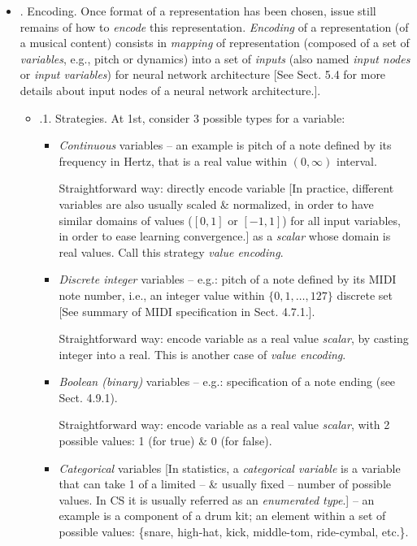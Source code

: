 \documentclass{article}
\begin{document}
\begin{itemize}
\begin{itemize}
\begin{itemize}
		\end{itemize}
		\item {. Encoding.} Once format of a representation has been chosen, issue still remains of how to {\it encode} this representation. {\it Encoding} of a representation (of a musical content) consists in {\it mapping} of representation (composed of a set of {\it variables}, e.g., pitch or dynamics) into a set of {\it inputs} (also named {\it input nodes} or {\it input variables}) for neural network architecture [See Sect. 5.4 for more details about input nodes of a neural network architecture.].
		\begin{itemize}
			\item {.1. Strategies.} At 1st, consider 3 possible types for a variable:
			\begin{itemize}
				\item {\it Continuous} variables -- an example is pitch of a note defined by its frequency in Hertz, that is a real value within $(0,\infty)$ interval.
				
				Straightforward way: directly encode variable [In practice, different variables are also usually scaled \& normalized, in order to have similar domains of values ($[0,1]$ or $[-1,1]$) for all input variables, in order to ease learning convergence.] as a {\it scalar} whose domain is real values. Call this strategy {\it value encoding}.
				\item {\it Discrete integer} variables -- e.g.: pitch of a note defined by its MIDI note number, i.e., an integer value within $\{0,1,\ldots,127\}$ discrete set [See summary of MIDI specification in Sect. 4.7.1.].
				
				Straightforward way: encode variable as a real value {\it scalar}, by casting integer into a real. This is another case of {\it value encoding}.
				\item {\it Boolean (binary)} variables -- e.g.: specification of a note ending (see Sect. 4.9.1).
				
				Straightforward way: encode variable as a real value {\it scalar}, with 2 possible values: 1 (for true) \& 0 (for false).
				\item {\it Categorical} variables [In statistics, a {\it categorical variable} is a variable that can take 1 of a limited -- \& usually fixed -- number of possible values. In CS it is usually referred as an {\it enumerated type}.] -- an example is a component of a drum kit; an element within a set of possible values: \{snare, high-hat, kick, middle-tom, ride-cymbal, etc.\}.
				

\end{itemize}
\end{itemize}
\end{itemize}
\end{itemize}
\end{document}
